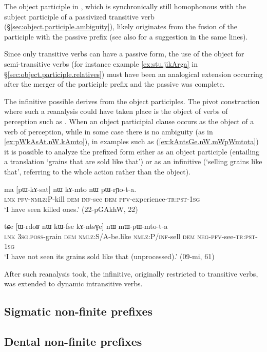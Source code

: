 The object participle in , which is synchronically still homophonous with the subject participle of a passivized transitive verb (§\ref{sec:object.participle.ambiguity}), likely originates from the fusion of the  participle with the passive  prefix (see also \citealt{jackson06guanxiju, jacksonlin07} for a suggestion in the same lines).

Since only transitive verbs can have a passive form, the use of the object for semi-transitive verbs (for instance example \ref{ex:stu.jikArga} in §\ref{sec:object.participle.relatives}) must have been an analogical extension occurring after the merger of the participle prefix and the passive was complete. 

The  infinitive possible derives from the object participles. The pivot construction where such a reanalysis could have taken place is the object of verbs of perception such as . When an object participial clause occurs as the object of a verb of perception, while in some case there is no ambiguity (as in \ref{ex:pWkAsAt.nW.kAmto}), in examples such as (\ref{ex:kAntsGe.nW.mWpWmtota}) it is possible to analyze the  prefixed form either as an object participle (entailing a translation `grains that are sold like that') or as an infinitive (`selling grains like that', referring to the whole action rather than the object).

\begin{exe}
\ex \label{ex:pWkAsAt.nW.kAmto} 
\gll ma [pɯ-kɤ-sat] nɯ kɤ-mto nɯ pɯ-rɲo-t-a. \\
\textsc{lnk} \textsc{pfv}-\textsc{nmlz}:P-kill \textsc{dem} \textsc{inf}-see \textsc{dem} \textsc{pfv}-experience-\textsc{tr}:\textsc{pst}-\textsc{1sg} \\
\glt `I have seen killed ones.' (22-pGAkhW, 22)
\end{exe}

\begin{exe}
\ex \label{ex:kAntsGe.nW.mWpWmtota} 
\gll tɕe [ɯ-rdoʁ nɯ kɯ-fse kɤ-ntsɣe] nɯ mɯ-pɯ-mto-t-a \\
\textsc{lnk} \textsc{3sg}.\textsc{poss}-grain \textsc{dem} \textsc{nmlz}:S/A-be.like \textsc{nmlz}:P/\textsc{inf}-sell \textsc{dem} \textsc{neg}-\textsc{pfv}-see-\textsc{tr}:\textsc{pst}-\textsc{1sg} \\
\glt `I have not seen its grains sold like that (unprocessed).' (09-mi, 61)
\end{exe}

After such reanalysis took, the  infinitive, originally restricted to transitive verbs, was extended to dynamic intransitive verbs. 


\subsection{Sigmatic non-finite prefixes} \label{sec:sigmatic.nmlz.history}

\subsection{Dental non-finite prefixes} \label{sec:dental.nmlz.history}
